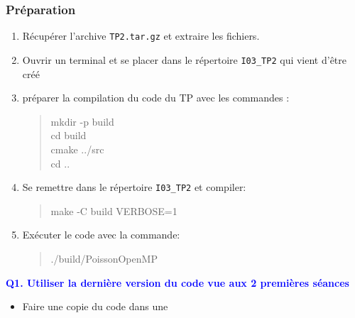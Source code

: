 \documentclass{beamer}
\begin{document}
\begin{frame}
\frametitle{Pr\'eparation}

\vfill
\begin{enumerate}
	\item R\'ecup\'erer l'archive {\tt TP2.tar.gz} et extraire les fichiers.
	\item Ouvrir un terminal et se placer dans le r\'epertoire {\tt I03\_TP2} \break qui vient d'\^etre cr\'e\'e
	\item préparer la compilation du code du TP avec les commandes :
	\begin{quote}
		mkdir -p build\\
		cd build\\
		cmake ../src\\
		cd ..
	\end{quote}
	\item Se remettre dans le r\'epertoire {\tt I03\_TP2} et compiler:
	\begin{quote}
		make -C build VERBOSE=1
	\end{quote}
\end{enumerate}
\vfill	
\end{frame}

\begin{frame}
	\begin{enumerate}
		\setcounter{enumi}{4}
		\item Ex\'ecuter le code avec la commande:
		\begin{quote}
			./build/PoissonOpenMP
		\end{quote}
	\end{enumerate}
\end{frame}

\begin{frame}
	\textcolor{blue}{\bf Q1. Utiliser la derni\`ere version du code vue aux 2 premi\`eres s\'eances}
	
	\begin{itemize}
		\item Faire une copie du code dans une 
	\end{itemize}
\end{frame}
\end{document}
